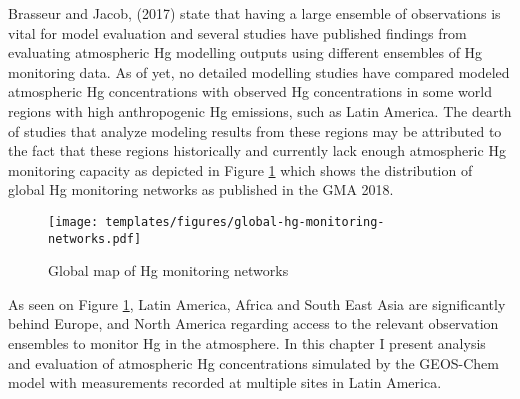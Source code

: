 \begin{flushleft}
 
Brasseur and Jacob, (2017) state that having a large ensemble of observations is vital for model evaluation and several studies have published findings from evaluating atmospheric Hg modelling outputs using different ensembles of Hg monitoring data\cite{brasseur_modeling_2017}. As of yet, no detailed modelling studies have compared modeled atmospheric Hg concentrations with observed Hg concentrations in some world regions with high anthropogenic Hg emissions, such as Latin America. The dearth of studies that analyze modeling results from these regions may be attributed to the fact that these regions historically and currently lack enough atmospheric Hg monitoring capacity as depicted in Figure \ref{fig:global-hg-monitoring-networks} which shows the distribution of global Hg monitoring networks as published in the GMA 2018. 
\end{flushleft}

\begin{figure}[H]
  \texttt{[image: templates/figures/global-hg-monitoring-networks.pdf]}
  \caption{Global map of Hg monitoring networks \cite{united_nations_environment_programme_technical_2019}}
  \label{fig:global-hg-monitoring-networks}
  \centering
  
\end{figure}
\FloatBarrier

\begin{flushleft}
 As seen on Figure \ref{fig:global-hg-monitoring-networks}, Latin America, Africa and South East Asia are significantly behind Europe, and North America regarding access to the relevant observation ensembles to monitor Hg in the atmosphere. In this chapter I present analysis and evaluation of atmospheric Hg concentrations simulated by the GEOS-Chem model with measurements recorded at multiple sites in Latin America. 
\end{flushleft}




